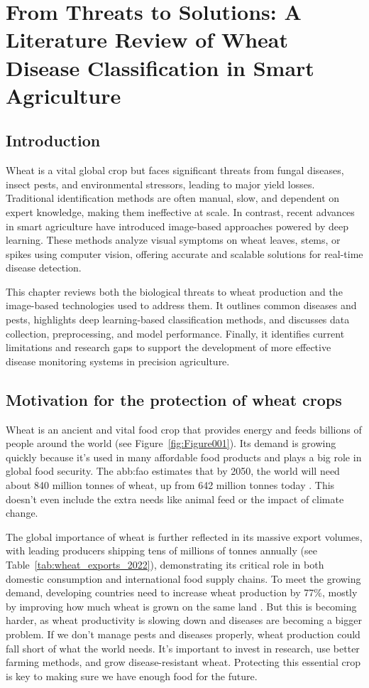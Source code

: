 \chapter{From Threats to Solutions: A Literature Review of Wheat Disease Classification in Smart Agriculture}


\section{Introduction}
Wheat is a vital global crop but faces significant threats from fungal diseases, insect pests, and environmental stressors, leading to major yield losses. Traditional identification methods are often manual, slow, and dependent on expert knowledge, making them ineffective at scale. In contrast, recent advances in smart agriculture have introduced image-based approaches powered by deep learning. These methods analyze visual symptoms on wheat leaves, stems, or spikes using computer vision, offering accurate and scalable solutions for real-time disease detection.

This chapter reviews both the biological threats to wheat production and the image-based technologies used to address them. It outlines common diseases and pests, highlights deep learning-based classification methods, and discusses data collection, preprocessing, and model performance. Finally, it identifies current limitations and research gaps to support the development of more effective disease monitoring systems in precision agriculture.

\section{Motivation for the protection of wheat crops}

Wheat is an ancient and vital food crop that provides energy and feeds billions of people around the world (see Figure~\ref{fig:Figure001}). Its demand is growing quickly because it’s used in many affordable food products and plays a big role in global food security. The \gls{abb:fao} estimates that by 2050, the world will need about 840 million tonnes of wheat, up from 642 million tonnes today \parencite{sharma2015wheat}. This doesn’t even include the extra needs like animal feed or the impact of climate change.

The global importance of wheat is further reflected in its massive export volumes, with leading producers shipping tens of millions of tonnes annually (see Table~\ref{tab:wheat_exports_2022}), demonstrating its critical role in both domestic consumption and international food supply chains. To meet the growing demand, developing countries need to increase wheat production by 77\%, mostly by improving how much wheat is grown on the same land \parencite{sharma2015wheat}.  But this is becoming harder, as wheat productivity is slowing down and diseases are becoming a bigger problem. If we don’t manage pests and diseases properly, wheat production could fall short of what the world needs. It’s important to invest in research, use better farming methods, and grow disease-resistant wheat. Protecting this essential crop is key to making sure we have enough food for the future.


